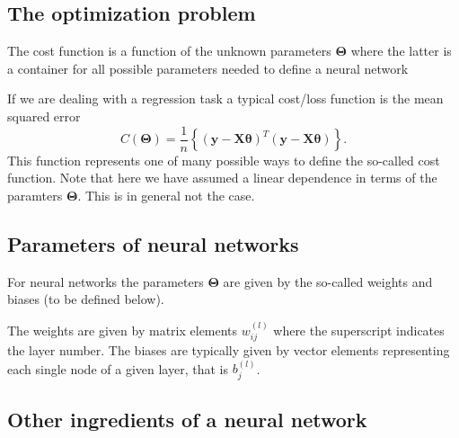 \documentclass[%
oneside,                 %
final,                   %
10pt]{article}
\begin{document}
\noindent
\subsection{The optimization problem}

The cost function is a function of the unknown parameters
$\bm{\Theta}$ where the latter is a container for all possible
parameters needed to define a neural network

If we are dealing with a regression task a typical cost/loss function
is the mean squared error
\[
C(\bm{\Theta})=\frac{1}{n}\left\{\left(\bm{y}-\bm{X}\bm{\theta}\right)^T\left(\bm{y}-\bm{X}\bm{\theta}\right)\right\}.
\]
This function represents one of many possible ways to define
the so-called cost function. Note that here we have assumed a linear dependence in terms of the paramters $\bm{\Theta}$. This is in general not the case.

\subsection{Parameters of neural networks}
For neural networks the parameters
$\bm{\Theta}$ are given by the so-called weights and biases (to be
defined below).

The weights are given by matrix elements $w_{ij}^{(l)}$ where the
superscript indicates the layer number. The biases are typically given
by vector elements representing each single node of a given layer,
that is $b_j^{(l)}$.

\subsection{Other ingredients of a neural network}
\end{document}
